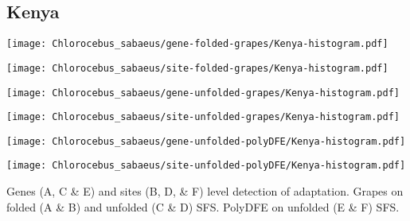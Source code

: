 \documentclass{article}
\begin{document}
\subsection{Kenya}
\centering
\begin{minipage}{0.49\linewidth}
    \texttt{[image: Chlorocebus\_sabaeus/gene-folded-grapes/Kenya-histogram.pdf]}
\end{minipage}%
\hfill
\begin{minipage}{0.49\linewidth}
    \texttt{[image: Chlorocebus\_sabaeus/site-folded-grapes/Kenya-histogram.pdf]}
\end{minipage}
\hfill
\begin{minipage}{0.49\linewidth}
    \texttt{[image: Chlorocebus\_sabaeus/gene-unfolded-grapes/Kenya-histogram.pdf]}
\end{minipage}%
\hfill
\begin{minipage}{0.49\linewidth}
    \texttt{[image: Chlorocebus\_sabaeus/site-unfolded-grapes/Kenya-histogram.pdf]}
\end{minipage}
\hfill
\begin{minipage}{0.49\linewidth}
    \texttt{[image: Chlorocebus\_sabaeus/gene-unfolded-polyDFE/Kenya-histogram.pdf]}
\end{minipage}%
\hfill
\begin{minipage}{0.49\linewidth}
    \texttt{[image: Chlorocebus\_sabaeus/site-unfolded-polyDFE/Kenya-histogram.pdf]}
\end{minipage}
\hfill
\flushleft
Genes (A, C \& E) and sites (B, D, \& F) level detection of adaptation.
Grapes on folded (A \& B) and unfolded (C \& D) SFS.
PolyDFE on unfolded (E \& F) SFS.

\pagebreak
\end{document}

